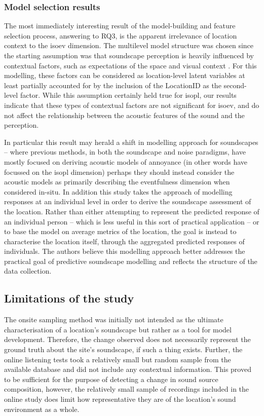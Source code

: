    \subsubsection{Model selection results}

   The most immediately interesting result of the model-building and feature selection process, answering to RQ3, is the apparent irrelevance of location context to the \gls{isoev} dimension. The multilevel model structure was chosen since the starting assumption was that soundscape perception is heavily influenced by contextual factors, such as expectations of the space and visual context . For this modelling, these factors can be considered as location-level latent variables at least partially accounted for by the inclusion of the LocationID as the second-level factor. While this assumption certainly held true for \gls{isopl}, our results indicate that these types of contextual factors are not significant for \gls{isoev}, and do not affect the relationship between the acoustic features of the sound and the perception.

   In particular this result may herald a shift in modelling approach for soundscapes -- where previous methods, in both the soundscape and noise paradigms, have mostly focused on deriving acoustic models of annoyance (in other words have focussed on the \gls{isopl} dimension) perhaps they should instead consider the acoustic models as primarily describing the eventfulness dimension when considered in-situ. In addition this study takes the approach of modelling responses at an individual level in order to derive the soundscape assessment of the location. Rather than either attempting to represent the predicted response of an individual person -- which is less useful in this sort of practical application -- or to base the model on average metrics of the location, the goal is instead to characterise the location itself, through the aggregated predicted responses of individuals. The authors believe this modelling approach better addresses the practical goal of predictive soundscape modelling and reflects the structure of the data collection.


 \subsection{Limitations of the study}

   The onsite sampling method was initially not intended as the ultimate characterisation of a location's soundscape but rather as a tool for model development. Therefore, the change observed does not necessarily represent the ground truth about the site's soundscape, if such a thing exists. Further, the online listening tests took a relatively small but random sample from the available database and did not include any contextual information. This proved to be sufficient for the purpose of detecting a change in sound source composition, however, the relatively small sample of recordings included in the online study does limit how representative they are of the location's sound environment as a whole.

